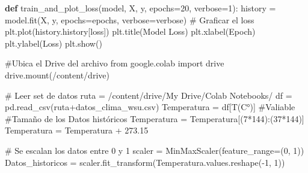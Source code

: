 \documentclass[
  us-letterpaper,
]{scrreprt}
\newenvironment{Shaded}{\begin{snugshade}}{\end{snugshade}}
\newcommand{\CommentTok}[1]{\textcolor[rgb]{0.37,0.37,0.37}{#1}}
\newcommand{\DecValTok}[1]{\textcolor[rgb]{0.68,0.00,0.00}{#1}}
\newcommand{\FloatTok}[1]{\textcolor[rgb]{0.68,0.00,0.00}{#1}}
\newcommand{\ImportTok}[1]{\textcolor[rgb]{0.00,0.46,0.62}{#1}}
\newcommand{\KeywordTok}[1]{\textcolor[rgb]{0.00,0.23,0.31}{\textbf{#1}}}
\newcommand{\NormalTok}[1]{\textcolor[rgb]{0.00,0.23,0.31}{#1}}
\newcommand{\OperatorTok}[1]{\textcolor[rgb]{0.37,0.37,0.37}{#1}}
\newcommand{\StringTok}[1]{\textcolor[rgb]{0.13,0.47,0.30}{#1}}
\theoremstyle{plain}
\theoremstyle{definition}
\theoremstyle{definition}
\theoremstyle{remark}
\begin{document}
\begin{Shaded}
\begin{Highlighting}[]
\KeywordTok{def}\NormalTok{ train\_and\_plot\_loss(model, X, y, epochs}\OperatorTok{=}\DecValTok{20}\NormalTok{, verbose}\OperatorTok{=}\DecValTok{1}\NormalTok{):}
\NormalTok{    history }\OperatorTok{=}\NormalTok{ model.fit(X, y, epochs}\OperatorTok{=}\NormalTok{epochs, verbose}\OperatorTok{=}\NormalTok{verbose)}
    \CommentTok{\# Graficar el loss}
\NormalTok{    plt.plot(history.history[}\StringTok{\textquotesingle{}loss\textquotesingle{}}\NormalTok{])}
\NormalTok{    plt.title(}\StringTok{\textquotesingle{}Model Loss\textquotesingle{}}\NormalTok{)}
\NormalTok{    plt.xlabel(}\StringTok{\textquotesingle{}Epoch\textquotesingle{}}\NormalTok{)}
\NormalTok{    plt.ylabel(}\StringTok{\textquotesingle{}Loss\textquotesingle{}}\NormalTok{)}
\NormalTok{    plt.show()}

    
\CommentTok{\#Ubica el Drive del archivo    }
\ImportTok{from}\NormalTok{ google.colab }\ImportTok{import}\NormalTok{ drive}
\NormalTok{drive.mount(}\StringTok{\textquotesingle{}/content/drive\textquotesingle{}}\NormalTok{)}


\CommentTok{\# Leer set de datos}
\NormalTok{ruta }\OperatorTok{=} \StringTok{\textquotesingle{}/content/drive/My Drive/Colab Notebooks/\textquotesingle{}}
\NormalTok{df }\OperatorTok{=}\NormalTok{ pd.read\_csv(ruta}\OperatorTok{+}\StringTok{\textquotesingle{}datos\_clima\_wsu.csv\textquotesingle{}}\NormalTok{)}
\NormalTok{Temperatura }\OperatorTok{=}\NormalTok{ df[}\StringTok{\textquotesingle{}T(C°)\textquotesingle{}}\NormalTok{] }\CommentTok{\#Valiable}
\CommentTok{\#Tamaño de los Datos históricos}
\NormalTok{Temperatura }\OperatorTok{=}\NormalTok{ Temperatura[(}\DecValTok{7}\OperatorTok{*}\DecValTok{144}\NormalTok{):(}\DecValTok{37}\OperatorTok{*}\DecValTok{144}\NormalTok{)] }
\NormalTok{Temperatura }\OperatorTok{=}\NormalTok{ Temperatura }\OperatorTok{+} \FloatTok{273.15} 

\CommentTok{\# Se escalan los datos entre 0 y 1}
\NormalTok{scaler }\OperatorTok{=}\NormalTok{ MinMaxScaler(feature\_range}\OperatorTok{=}\NormalTok{(}\DecValTok{0}\NormalTok{, }\DecValTok{1}\NormalTok{))}
\NormalTok{Datos\_historicos }\OperatorTok{=}\NormalTok{ scaler.fit\_transform(Temperatura.values.reshape(}\OperatorTok{{-}}\DecValTok{1}\NormalTok{, }\DecValTok{1}\NormalTok{))}
\end{Highlighting}
\end{Shaded}
\end{document}
